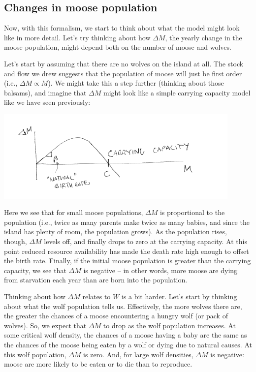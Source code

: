 \documentclass{tufte-handout}
\begin{document}
\subsection{Changes in moose population}
Now, with this formalism, we start to think about what the model might look like in more detail.  Let's try thinking about how $\Delta M$, the yearly change in the moose population, might depend both on the number of moose and wolves.  

Let's start by assuming that there are no wolves on the island at all. The stock and flow we drew suggests that the population of moose will just be first order (i.e., $\Delta M \propto M$).  We might take this a step further (thinking about those balsams), and imagine that $\Delta M$ might look like a simple carrying capacity model like we have seen previously:

\includegraphics[width=12cm]{figs/DeltaMvsM}


Here we see that for small moose populations, $\Delta M$ is proportional to the population (i.e., twice as many parents make twice as many babies, and since the island has plenty of room, the population grows).  As the population rises, though, $\Delta M$ levels off, and finally drops to zero at the carrying capacity.  At this point reduced resource availability has made the death rate high enough to offset the birth rate.  Finally, if the initial moose population is greater than the carrying capacity, we see that $\Delta M$ is negative -- in other words, more moose are dying from starvation each year than are born into the population.

Thinking about how $\Delta M$ relates to $W$ is a bit harder.  Let's start by thinking about what the wolf population tells us.  Effectively, the more wolves there are, the greater the chances of a moose encountering a hungry wolf (or pack of wolves).  So, we expect that $\Delta M$ to drop as the wolf population increases.  At some critical wolf density, the chances of a moose having a baby are the same as the chances of the moose being eaten by a wolf or dying due to natural causes.  At this wolf population, $\Delta M$ is zero.  And, for  large wolf densities, $\Delta M$ is negative:  moose are more likely to be eaten or to die than to reproduce.
\end{document}
